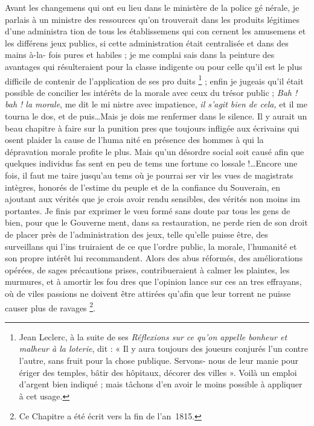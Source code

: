 Avant les changemens qui ont eu
lieu dans le ministère de la police gé%
nérale, je parlais à un ministre des
ressources qu'on trouverait dans les
produits légitimes d'une administra%
tion de tous les établissemens qui con%
cernent les amusemens et les différens
jeux publics, si cette administration
était centralisée et dans des mains à-la-%
fois pures et habiles ; je me complai%
sais dans la peinture des avantages qui
résulteraient pour la classe indigente
ou pour celle qu'il est le plus difficile
de contenir de l'application de ses pro%
duits
\footnote{Jean Leclerc, à la suite de ses \emph{Réflexions sur ce
  qu'on appelle bonheur et malheur à la loterie}, dit :
  « Il y aura toujours des joueurs conjurés l'un contre
  l'autre, sans fruit pour la chose publique. Servons-%
  nous de leur manie pour ériger des temples, bâtir des
  hôpitaux, décorer des villes ».
  Voilà un emploi d'argent bien indiqué ; mais tâchons
d'en avoir le moins possible à appliquer à cet usage.} ;
enfin je jugeais qu'il était
possible de concilier les intérêts de la
morale avec ceux du trésor public ;
\emph{Bah ! bah ! la morale}, me dit le mi%
nistre avec impatience, \emph{il s'agit bien
de cela,} et il me tourna le dos, et de%
puis\ldots Mais je dois me renfermer
dans le silence. Il y aurait un beau
chapitre à faire sur la punition pres%
que toujours infligée aux écrivains
qui osent plaider la cause de l'huma%
nité en présence des hommes à qui la
dépravation morale profite le plus.
Mais qu'un désordre social soit
causé afin que quelques individus fas%
sent en peu de tems une fortune co%
lossale !\ldots Encore une fois, il faut me
taire jusqu'au tems où je pourrai ser%
vir les vues de magistrats intègres,
honorés de l'estime du peuple et de la
confiance du Souverain, en ajoutant
aux vérités que je crois avoir rendu
sensibles, des vérités non moins im%
portantes. Je finis par exprimer le
v{\oe}u formé sans doute par tous les
gens de bien, pour que le Gouverne%
ment, dans sa restauration, ne perde
rien de son droit de placer près de
l'administration des jeux, telle qu'elle
puisse être, des surveillans qui l'ins%
truiraient de ce que l'ordre public,
la morale, l'humanité et son propre
intérêt lui recommandent. Alors des
abus réformés, des améliorations
opérées, de sages précautions prises,
contribueraient à calmer les plaintes,
les murmures, et à amortir les fou%
dres que l'opinion lance sur ces an%
tres effrayans, où de viles passions
ne doivent être attirées qu'afin que
leur torrent ne puisse causer plus de
ravages \footnote{
  Ce Chapitre a été écrit vers la fin de l'an~1815.
}.
